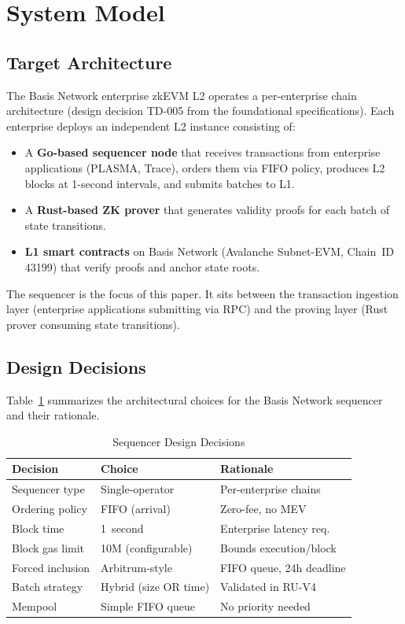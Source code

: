 
\section{System Model}

\subsection{Target Architecture}

The Basis Network enterprise zkEVM L2 operates a per-enterprise chain architecture
(design decision TD-005 from the foundational specifications). Each enterprise deploys
an independent L2 instance consisting of:

\begin{itemize}
  \item A \textbf{Go-based sequencer node} that receives transactions from enterprise
    applications (PLASMA, Trace), orders them via FIFO policy, produces L2 blocks at
    1-second intervals, and submits batches to L1.
  \item A \textbf{Rust-based ZK prover} that generates validity proofs for each batch
    of state transitions.
  \item \textbf{L1 smart contracts} on Basis Network (Avalanche Subnet-EVM, Chain~ID
    43199) that verify proofs and anchor state roots.
\end{itemize}

The sequencer is the focus of this paper. It sits between the transaction ingestion
layer (enterprise applications submitting via RPC) and the proving layer (Rust prover
consuming state transitions).

\subsection{Design Decisions}

Table~\ref{tab:design-decisions} summarizes the architectural choices for the Basis
Network sequencer and their rationale.

\begin{table}[htbp]
\caption{Sequencer Design Decisions}
\label{tab:design-decisions}
\centering
\begin{tabular}{lll}
\toprule
\textbf{Decision} & \textbf{Choice} & \textbf{Rationale} \\
\midrule
Sequencer type & Single-operator & Per-enterprise chains \\
Ordering policy & FIFO (arrival) & Zero-fee, no MEV \\
Block time & 1~second & Enterprise latency req. \\
Block gas limit & 10M (configurable) & Bounds execution/block \\
Forced inclusion & Arbitrum-style & FIFO queue, 24h deadline \\
Batch strategy & Hybrid (size OR time) & Validated in RU-V4 \\
Mempool & Simple FIFO queue & No priority needed \\
\bottomrule
\end{tabular}
\end{table}

